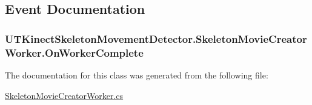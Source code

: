 \subsection{Event Documentation}
\hypertarget{classUTKinectSkeletonMovementDetector_1_1SkeletonMovieCreatorWorker_a216a708362bfed5567535e47a6124dfb}{
\subsubsection[{On\-Worker\-Complete}]{ U\-T\-Kinect\-Skeleton\-Movement\-Detector.\-Skeleton\-Movie\-Creator\-Worker.\-On\-Worker\-Complete}}\label{classUTKinectSkeletonMovementDetector_1_1SkeletonMovieCreatorWorker_a216a708362bfed5567535e47a6124dfb}


The documentation for this class was generated from the following file\-:\begin{DoxyCompactItemize}
\item 
\hyperlink{SkeletonMovieCreatorWorker_8cs}{Skeleton\-Movie\-Creator\-Worker.\-cs}\end{DoxyCompactItemize}

